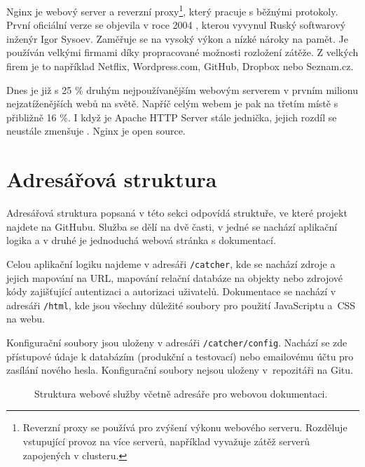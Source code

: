 Nginx je webový server a reverzní proxy\footnote{Reverzní proxy se používá pro zvýšení výkonu webového serveru.
Rozděluje vstupující provoz na více serverů, například vyvažuje zátěž serverů zapojených v clusteru.}, který pracuje s běžnými protokoly.
První oficiální verze se objevila v roce 2004 \cite{nginx-changes}, kterou vyvynul Ruský softwarový inženýr Igor Sysoev.
Zaměřuje se na vysoký výkon a nízké nároky na pamět. Je používán velkými firmami
díky propracované možnosti rozložení zátěže. Z velkých firem je to například Netflix, Wordpress.com,
GitHub, Dropbox nebo Seznam.cz.

Dnes je již s 25 \% druhým nejpoužívanějším webovým serverem v prvním milionu nejzatíženějších webů na světě.
Napříč celým webem je pak na třetím místě s přibližně 16 \%. I když je Apache HTTP Server stále jednička, 
jejich rozdíl se neustále zmenšuje \cite{nginx-statistic}. Nginx je open source.


\section{Adresářová struktura}


Adresářová struktura popsaná v této sekci odpovídá struktuře, ve které projekt najdete na GitHubu.
Služba se dělí na dvě časti, v jedné se nachází aplikační logika a v druhé je jednoduchá webová stránka s dokumentací.

Celou aplikační logiku najdeme v adresáři \texttt{/catcher}, kde se nachází zdroje a jejich mapování na URL,
mapování relační databáze na objekty nebo zdrojové kódy zajišťující autentizaci a autorizaci uživatelů.
Dokumentace se nachází v adresáři \texttt{/html}, kde jsou všechny důležité soubory pro použití JavaScriptu a~CSS na webu.

Konfigurační soubory jsou uloženy v adresáři \texttt{/catcher/config}.
Nachází se zde přístupové údaje k databázím (produkční a testovací) nebo emailovému účtu pro zasílání nového hesla.
Konfigurační soubory nejsou uloženy v~repozitáři na Gitu. 

\begin{figure}[ht!]
\caption{Struktura webové služby včetně adresáře pro webovou dokumentaci.\label{overflow}}
\end{figure}

